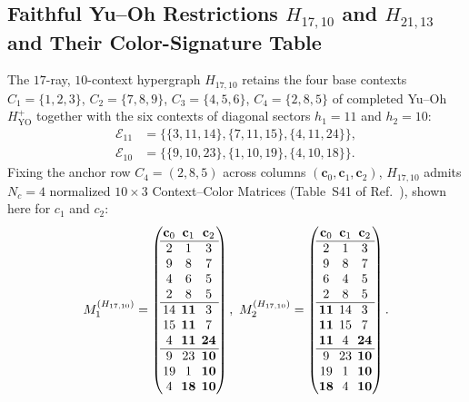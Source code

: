 \documentclass[aps,pra,reprint,superscriptaddress,longbibliography,nofootinbib,floatfix,10pt]{revtex4-2}
\theoremstyle{definition}\newtheorem{definition}[theorem]{Definition}
\theoremstyle{remark}\newtheorem{remark}[theorem]{Remark}
\newcommand{\YO}{\mathrm{YO}}\newcommand{\ip}[2]{\langle #1,#2\rangle}
\begin{document}
\subsection{Faithful Yu--Oh Restrictions \texorpdfstring{$H_{17,10}$ and $H_{21,13}$}{H17,10 and H21,13} and Their Color-Signature Table}\label{sec:H17-H21}

The $17$-ray, $10$-context hypergraph $H_{17,10}$ retains the four base contexts $C_1=\{1,2,3\}$, $C_2=\{7,8,9\}$, $C_3=\{4,5,6\}$, $C_4=\{2,8,5\}$ of completed Yu--Oh $H_{\YO}^+$ together with the six contexts of diagonal sectors $h_1=11$ and $h_2=10$:
\begin{equation}\label{eq:H17-sectors}
\begin{aligned}
\mathcal{E}_{11}&=\bigl\{\{3,11,14\},\{7,11,15\},\{4,11,24\}\bigr\},\\
\mathcal{E}_{10}&=\bigl\{\{9,10,23\},\{1,10,19\},\{4,10,18\}\bigr\}.
\end{aligned}
\end{equation}
Fixing the anchor row $C_4=(2,8,5)$ across columns $(\mathbf{c}_0,\mathbf{c}_1,\mathbf{c}_2)$, $H_{17,10}$ admits $N_c=4$ normalized $10\times 3$ Context--Color Matrices (Table~S41 of Ref.~\cite{supplement}), shown here for $c_1$ and $c_2$:
\begin{equation}\label{eq:H17-matrices}
\setlength{\arraycolsep}{2.2pt}
M_1^{(H_{17,10})}=\begin{pmatrix}
\mathbf{c}_0&\mathbf{c}_1&\mathbf{c}_2\\\hline
2&1&3\\
9&8&7\\
4&6&5\\
2&8&5\\\hline
14&\mathbf{11}&3\\
15&\mathbf{11}&7\\
4&\mathbf{11}&\mathbf{24}\\\hline
9&23&\mathbf{10}\\
19&1&\mathbf{10}\\
4&\mathbf{18}&\mathbf{10}
\end{pmatrix},\
M_2^{(H_{17,10})}=\begin{pmatrix}
\mathbf{c}_0&\mathbf{c}_1&\mathbf{c}_2\\\hline
2&1&3\\
9&8&7\\
6&4&5\\
2&8&5\\\hline
\mathbf{11}&14&3\\
\mathbf{11}&15&7\\
\mathbf{11}&4&\mathbf{24}\\\hline
9&23&\mathbf{10}\\
19&1&\mathbf{10}\\
\mathbf{18}&4&\mathbf{10}
\end{pmatrix}.
\end{equation}
\end{document}
